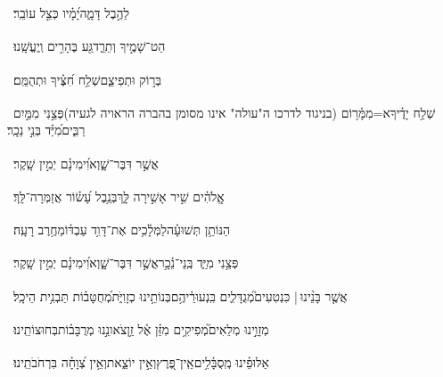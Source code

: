 \documentclass[12pt]{article}
\newcommand{\loc}[1]{\textsuperscript{\locf{#1}}}
\begin{document}
{\loc{ ד}~}‏ לַהֶ֣בֶל דָּמָ֑ה{\hfill}יָ֝מָ֗יו כְּצֵ֣ל עוֹבֵֽר׃\par

{\loc{ ה}~}‏ הַט־שָׁמֶ֣יךָ וְתֵרֵ֑ד{\hfill}גַּ֖ע בֶּהָרִ֣ים וְֽיֶעֱשָֽׁנוּ׃\par

{\loc{ ו}~}‏בְּר֣וֹק  וּתְפִיצֵ֑ם{\hfill}שְׁלַ֥ח חִ֝צֶּ֗יךָ וּתְהֻמֵּֽם׃\par

{\loc{ ז}~}‏שְׁלַ֥ח יָדֶ֗יךָ{\hfill}א=מִמָּ֫ר֥וֹם (בניגוד לדרכו ה"עולה" אינו מסומן בהברה הראויה לגעיה)\newline\hspace*{.5em}פְּצֵ֣נִי  מִמַּ֣יִם רַבִּ֑ים{\hfill}מִ֝יַּ֗ד בְּנֵ֣י נֵכָֽר׃\par

{\loc{ ח}~}‏אֲשֶׁ֣ר  דִּבֶּר־שָׁ֑וְא{\hfill}וִ֝ימִינָ֗ם יְמִ֣ין שָֽׁקֶר׃\par

{\loc{ ט}~}‏אֱֽלֹהִ֗ים שִׁ֣יר  אָשִׁ֣ירָה לָּ֑ךְ{\hfill}בְּנֵ֥בֶל עָ֝שׂ֗וֹר אֲזַמְּרָה־לָּֽךְ׃\par

{\loc{ י}~}‏הַנּוֹתֵ֥ן תְּשׁוּעָ֗ה{\hfill}לַמְּלָ֫כִ֥ים\newline\hspace*{.5em} אֶת־דָּוִ֥ד עַבְדּ֗וֹ{\hfill}מֵחֶ֥רֶב רָעָֽה׃\par

{\loc{ יא}~}‏פְּצֵ֥נִי {\hfill}מִיַּ֢ד בְּֽנֵי־נֵ֫כָ֥ר\newline\hspace*{.5em}אֲשֶׁ֣ר  דִּבֶּר־שָׁ֑וְא{\hfill}וִ֝ימִינָ֗ם יְמִ֣ין שָֽׁקֶר׃\par

{\loc{ יב}~}‏אֲשֶׁ֤ר בָּנֵ֨ינוּ |  כִּנְטִעִים֮{\hfill}מְגֻדָּלִ֢ים בִּֽנְעוּרֵ֫יהֶ֥ם\newline\hspace*{.5em}בְּנוֹתֵ֥ינוּ כְזָוִיֹּ֑ת{\hfill}מְ֝חֻטָּב֗וֹת תַּבְנִ֥ית הֵיכָֽל׃\par

{\loc{ יג}~}‏מְזָוֵ֣ינוּ מְלֵאִים֮{\hfill}מְפִיקִ֥ים מִזַּ֗ן אֶ֫ל זַ֥ן\newline\hspace*{.5em}צֹאונֵ֣נוּ  מְרֻבָּב֗וֹת{\hfill}בְּחוּצוֹתֵֽינוּ׃\par

{\loc{ יד}~}‏אַלּוּפֵ֗ינוּ מְֽסֻבָּ֫לִ֥ים{\hfill}אֵֽין־פֶּ֭רֶץ\newline\hspace*{.5em}וְאֵ֣ין יוֹצֵ֑את{\hfill}וְאֵ֥ין צְ֝וָחָ֗ה בִּרְחֹבֹתֵֽינוּ׃\par
\end{document}
